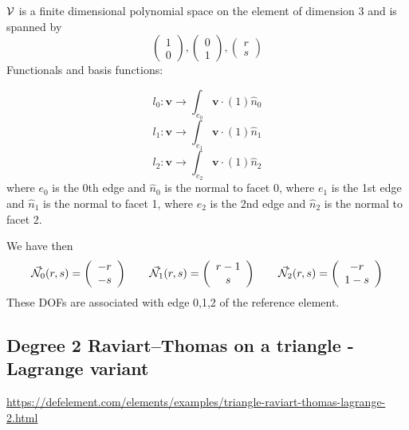 ${\cal V}$ is a finite dimensional polynomial space on the element of dimension $3$ and is spanned by \cite{ergu21_72} 
\[
\left( \begin{array}{c} 1 \\ 0  \end{array} \right),
\left( \begin{array}{c} 0 \\ 1  \end{array} \right),
\left( \begin{array}{c} r \\ s  \end{array} \right)
\]
Functionals and basis functions:

\[
l_0: {\bm v} \rightarrow \int_{e_0} {\bm v} \cdot (1) \hat{n}_0
\]
\[
l_1: {\bm v} \rightarrow \int_{e_1} {\bm v} \cdot (1) \hat{n}_1
\]
\[
l_2: {\bm v} \rightarrow \int_{e_2} {\bm v} \cdot (1) \hat{n}_2
\]
where $e_0$ is the 0th edge and $\hat{n}_0$ is the normal to facet 0,
where $e_1$ is the 1st edge and $\hat{n}_1$ is the normal to facet 1,
where $e_2$ is the 2nd edge and $\hat{n}_2$ is the normal to facet 2.

We have then
\[
\vec{{\mathcal{N}}}_0(r,s) = \left( \begin{array}{c} -r\\-s  \end{array} \right)
\qquad
\vec{{\mathcal{N}}}_1(r,s) = \left( \begin{array}{c} r-1\\s  \end{array} \right)
\qquad
\vec{{\mathcal{N}}}_2(r,s) = \left( \begin{array}{c} -r \\ 1-s  \end{array} \right)
\]
These DOFs are associated with edge 0,1,2 of the reference element.

\subsection{Degree 2 Raviart–Thomas on a triangle - Lagrange variant}

\url{https://defelement.com/elements/examples/triangle-raviart-thomas-lagrange-2.html}

